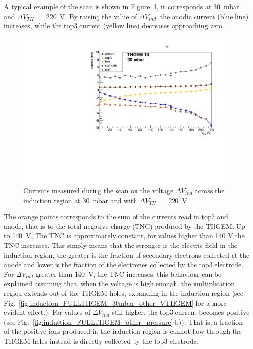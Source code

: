 \documentclass[a4paper, 11 pt]{report}
\newcommand{\Vind}{$\Delta V_{ind}$}
\newcommand{\Vthgem}{$\Delta V_{TH}$}
\begin{document}
A typical example of the scan is shown in Figure~\ref{fig:induction_FULLTHGEM_30mbar}, it corresponds
at 30~mbar and \Vthgem{}~=~220~V. By raising the value of \Vind{}, the anodic current (blue line) 
increases, while the top3 current (yellow line) decreases approaching zero.
\begin{figure}[!t]
	\centering
	\includegraphics[width=\textwidth]{Immagini/inductionScan_THGEM10_30mbar.pdf}
	\caption{Currents measured during the scan on the voltage \Vind{} across the induction region at 
	30~mbar and with \Vthgem{}~=~220~V.}
	\label{fig:induction_FULLTHGEM_30mbar}
\end{figure}
The orange points corresponds to the sum of the currents read in top3 and anode, that is to the total 
negative charge (TNC) produced by the THGEM. Up to 140~V, The TNC is approximately constant, 
for values higher than 140 V the TNC increases.
This simply means that the stronger is the electric field in the induction region, the greater is 
the fraction of secondary electrons collected at the anode and lower is the fraction of the 
electrones collected by the top3 electrode.
For \Vind{} greater than 140~V, the TNC increases: this behaviour can be explained assuming that, 
when the voltage is high enough, the multiplication region extends out of the THGEM holes, 
expanding in the induction region (see Fig.~\ref{fig:induction_FULLTHGEM_30mbar_other_VTHGEM} for a 
more evident effect.). For values of \Vind{} still higher, the top3 current becomes positive (see 
Fig.~\ref{fig:induction_FULLTHGEM_other_pressure} b)). That is, a fraction of the positive ions 
produced in the induction region is cannot flow through the THGEM holes instead is directly 
collected by the top3 electrode.\\
\end{document}
